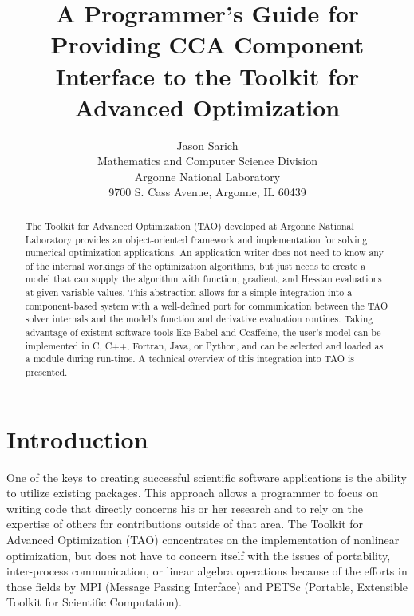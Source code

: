 \documentclass[doublespacing,12pt]{article}
\begin{document}
\title{A Programmer's Guide for Providing CCA Component 
Interface to the Toolkit for Advanced Optimization}
\author{Jason Sarich\\
       Mathematics and Computer Science Division \\
       Argonne National Laboratory \\
       9700 S. Cass Avenue, Argonne, IL 60439\\}
\maketitle
\begin{abstract}
The Toolkit for Advanced Optimization (TAO) developed at Argonne
National Laboratory provides an object-oriented framework and
implementation for solving numerical optimization applications.  An
application writer does not need to know any of the internal workings
of the optimization algorithms, but just needs to create a model that 
can supply the algorithm
with function, gradient, and Hessian evaluations at given variable
values.  This abstraction allows for a simple integration into a
component-based system with a well-defined port for communication
between the TAO solver internals and the model's function and derivative 
evaluation routines.
Taking advantage of existent software tools like Babel and Ccaffeine, 
the user's model can be implemented in C, C++, Fortran, Java, or
Python, and can be selected and loaded as a module during run-time.
A technical overview of this integration into TAO is presented.
\end{abstract}

\section{Introduction}
One of the keys to creating successful scientific software
applications is the ability to
utilize existing packages.  This approach allows a programmer to
focus on writing code that directly concerns his or her
research and to rely on the expertise of others for contributions
outside of that area.  The Toolkit for Advanced Optimization (TAO\cite{tao})
concentrates on the implementation of nonlinear optimization, but
does not have to concern itself with the issues of portability,
inter-process communication, or linear algebra operations because of
the efforts in those fields by MPI (Message Passing
Interface\cite{mpi}) and PETSc (Portable, Extensible Toolkit 
for Scientific Computation\cite{petsc}). 
\end{document}
